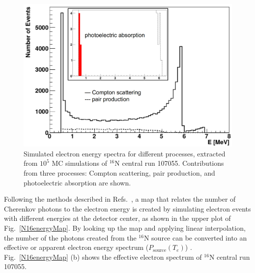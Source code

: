 \begin{figure}[htbp]
	\centering
	\includegraphics[width=12cm]{N16_MCenergySpectrum.png}
	\caption[Simulated electron energy spectra for different processes.]{Simulated electron energy spectra for different processes, extracted from $10^5$ MC simulations of $^{16}$N central run 107055. Contributions from three processes: Compton scattering, pair production, and photoelectric absorption are shown.\label{fig:N16nhitsSimu}}
\end{figure}

Following the methods described in Refs.~\cite{waterunidoc,morganThesis}, a map that relates the number of Cherenkov photons to the electron energy is created by simulating electron events with different energies at the detector center, as shown in the upper plot of Fig.~\ref{N16energyMap}. By looking up the map and applying linear interpolation, the number of the photons created from the $^{16}$N source can be converted into an effective or apparent electron energy spectrum ($P_\mathrm{source}(T_e)$) \cite{waterunidoc}. Fig.~\ref{N16energyMap} (b) shows the effective electron spectrum of $^{16}$N central run 107055.



